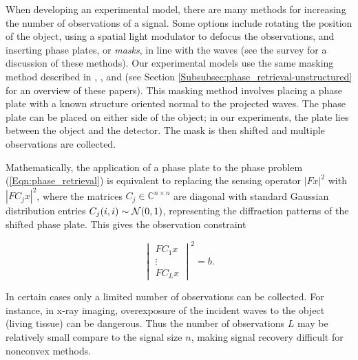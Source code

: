 When developing an experimental model, there are many methods for increasing the number of observations of a signal.  Some options include rotating the position of the object, using a spatial light modulator to defocus the observations, and inserting phase plates, or \textit{masks}, in line with the waves (see the survey \cite{duadi2011digital} for a discussion of these methods).  Our experimental models use the same masking method described in \cite[Section 2]{DBLP:journals/siamis/CandesESV13}, \cite[Sections 4.2, 4.3]{DBLP:journals/tit/CandesLS15}, and \cite[Section 5.1]{DBLP:journals/siamsc/FriedlanderM16} (see Section \ref{Subsubsec:phase_retrieval-unstructured} for an overview of these papers).  This masking method involves placing a phase plate with a known structure oriented normal to the projected waves.  The phase plate can be placed on either side of the object; in our experiments, the plate lies between the object and the detector.  The mask is then shifted and multiple observations are collected.




Mathematically, the application of a phase plate to the phase problem (\ref{Eqn:phase_retrieval}) is equivalent to replacing the sensing operator $|Fx|^2$ with $|FC_jx|^2$, where the matrices $C_j \in \mathbb{C}^{n \times n}$ are diagonal with standard Gaussian distribution entries $C_j(i,i) \sim {\mathcal N}(0, 1)$, representing the diffraction patterns of the shifted phase plate.  This gives the observation constraint

\begin{equation}		\label{Eqn:FCx}
	\begin{vmatrix}
		FC_1x \\ \vdots \\ FC_Lx
	\end{vmatrix}^2
	= b.
\end{equation}

In certain cases only a limited number of observations can be collected.  For instance, in x-ray imaging, overexposure of the incident waves to the object (living tissue) can be dangerous.  Thus the number of observations $L$ may be relatively small compare to the signal size $n$, making signal recovery difficult for nonconvex methods.






